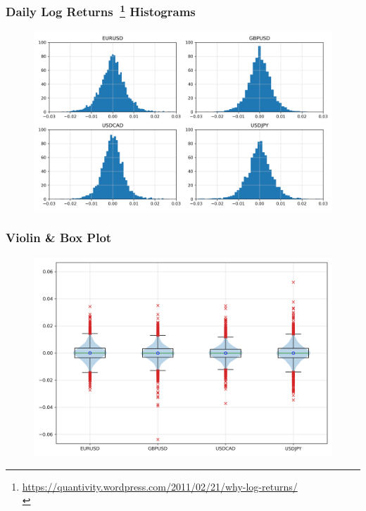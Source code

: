 \documentclass{beamer}
\begin{document}
\begin{frame}
    \frametitle{Daily Log Returns~\footnote{\href{https://quantivity.wordpress.com/2011/02/21/why-log-returns/}{https://quantivity.wordpress.com/2011/02/21/why-log-returns/} \\} Histograms}
    \begin{figure}
        \includegraphics[width=0.9\linewidth]{histograms.png}
        \label{histograms}
    \end{figure}
\end{frame}

\begin{frame}
    \frametitle{Violin \& Box Plot}
    \begin{figure}
        \includegraphics[width=0.9\linewidth]{violin.png}
        \label{violin}
    \end{figure}
\end{frame}

\end{document}

